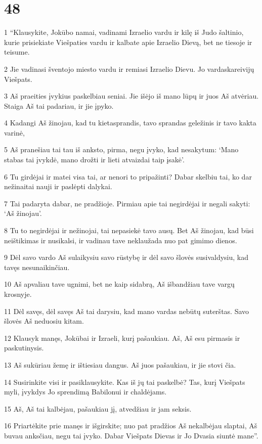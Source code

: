 \chapter{48}


\par 1 “Klausykite, Jokūbo namai, vadinami Izraelio vardu ir kilę iš Judo šaltinio, kurie prisiekiate Viešpaties vardu ir kalbate apie Izraelio Dievą, bet ne tiesoje ir teisume. 
\par 2 Jie vadinasi šventojo miesto vardu ir remiasi Izraelio Dievu. Jo vardas­kareivijų Viešpats. 
\par 3 Aš praeities įvykius paskelbiau seniai. Jie išėjo iš mano lūpų ir juos Aš atvėriau. Staiga Aš tai padariau, ir jie įpyko. 
\par 4 Kadangi Aš žinojau, kad tu kietasprandis, tavo sprandas geležinis ir tavo kakta varinė, 
\par 5 Aš pranešiau tai tau iš anksto, pirma, negu įvyko, kad nesakytum: ‘Mano stabas tai įvykdė, mano drožti ir lieti atvaizdai taip įsakė’. 
\par 6 Tu girdėjai ir matei visa tai, ar nenori to pripažinti? Dabar skelbiu tai, ko dar nežinai­tai nauji ir paslėpti dalykai. 
\par 7 Tai padaryta dabar, ne pradžioje. Pirmiau apie tai negirdėjai ir negali sakyti: ‘Aš žinojau’. 
\par 8 Tu to negirdėjai ir nežinojai, tai nepasiekė tavo ausų. Bet Aš žinojau, kad būsi neištikimas ir nusikalsi, ir vadinau tave neklaužada nuo pat gimimo dienos. 
\par 9 Dėl savo vardo Aš sulaikysiu savo rūstybę ir dėl savo šlovės susivaldysiu, kad tavęs nesunaikinčiau. 
\par 10 Aš apvaliau tave ugnimi, bet ne kaip sidabrą, Aš išbandžiau tave vargų krosnyje. 
\par 11 Dėl savęs, dėl savęs Aš tai darysiu, kad mano vardas nebūtų suterštas. Savo šlovės Aš neduosiu kitam. 
\par 12 Klausyk manęs, Jokūbai ir Izraeli, kurį pašaukiau. Aš, Aš esu pirmasis ir paskutinysis. 
\par 13 Aš sukūriau žemę ir ištiesiau dangus. Aš juos pašaukiau, ir jie stovi čia. 
\par 14 Susirinkite visi ir pasiklausykite. Kas iš jų tai paskelbė? Tas, kurį Viešpats myli, įvykdys Jo sprendimą Babilonui ir chaldėjams. 
\par 15 Aš, Aš tai kalbėjau, pašaukiau jį, atvedžiau ir jam seksis. 
\par 16 Priartėkite prie manęs ir išgirskite; nuo pat pradžios Aš nekalbėjau slaptai, Aš buvau anksčiau, negu tai įvyko. Dabar Viešpats Dievas ir Jo Dvasia siuntė mane”. 

